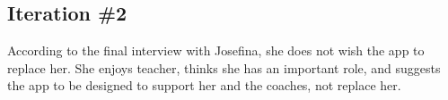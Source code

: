 \subsection{Iteration \#2}

According to the final interview with Josefina, she does not wish the app to replace her. She enjoys teacher, thinks she has an important role, and suggests the app to be designed to support her and the coaches, not replace her.
